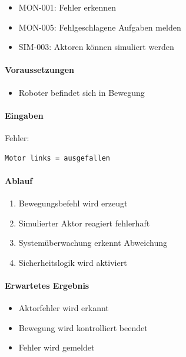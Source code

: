 \begin{itemize}
\tightlist
\item
  MON-001: Fehler erkennen
\item
  MON-005: Fehlgeschlagene Aufgaben melden
\item
  SIM-003: Aktoren können simuliert werden
\end{itemize}

\paragraph{Voraussetzungen}\label{voraussetzungen-21}

\begin{itemize}
\tightlist
\item
  Roboter befindet sich in Bewegung
\end{itemize}

\paragraph{Eingaben}\label{eingaben-18}

Fehler:

\begin{verbatim}
Motor links = ausgefallen
\end{verbatim}

\paragraph{Ablauf}\label{ablauf-21}

\begin{enumerate}
\def\labelenumi{\arabic{enumi}.}
\tightlist
\item
  Bewegungsbefehl wird erzeugt
\item
  Simulierter Aktor reagiert fehlerhaft
\item
  Systemüberwachung erkennt Abweichung
\item
  Sicherheitslogik wird aktiviert
\end{enumerate}

\paragraph{Erwartetes Ergebnis}\label{erwartetes-ergebnis-21}

\begin{itemize}
\tightlist
\item
  Aktorfehler wird erkannt
\item
  Bewegung wird kontrolliert beendet
\item
  Fehler wird gemeldet
\end{itemize}

